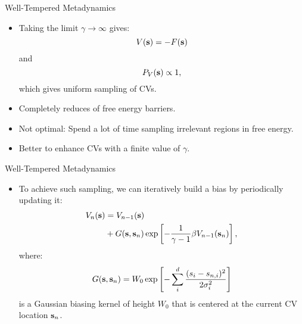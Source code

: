 \documentclass[10pt]{beamer}
\begin{document}
\begin{frame}{Well-Tempered Metadynamics}
\begin{itemize}
\setlength\itemsep{1em}
  \item Taking the limit $\gamma\to\infty$ gives:
  \begin{equation}
    V({\bf s}) = -F({\bf s})
  \end{equation}
  and
  \begin{equation}
    P_V({\bf s}) \propto 1,
  \end{equation}
  which gives uniform sampling of CVs.

  \item Completely reduces of free energy barriers.

  \item Not optimal: Spend a lot of time sampling irrelevant regions in free energy.

  \item Better to enhance CVs with a finite value of $\gamma$.
\end{itemize}
\end{frame}

\begin{frame}{Well-Tempered Metadynamics}
\begin{itemize}
\setlength\itemsep{1em}
  \item To achieve such sampling, we can iteratively build a bias by periodically updating it:
  \begin{align}
    V_n({\bf s}) &= V_{n-1}({\bf s}) \nonumber\\
             &+ G({\bf s},{\bf s}_n)\exp\left[ -\frac{1}{\gamma-1}\beta V_{n-1}({\bf s}_n) \right],
  \end{align}
  where:
  \begin{equation}
    G({\bf s},{\bf s}_n) = W_0 \exp\left[ -\sum_i^d \frac{(s_i-s_{n,i})^2}{2\sigma^2_i} \right]
  \end{equation}
  is a Gaussian biasing kernel of height $W_0$ that is centered at the current CV location ${\bf s}_n$.
\end{itemize}
\end{frame}
\end{document}
